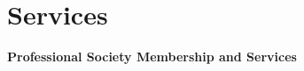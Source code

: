 \documentclass[paper=a4,fontsize=11pt]{scrartcl}
\begin{document}









\section*{Services}

\textbf{Professional Society Membership and Services} 
\end{document}
